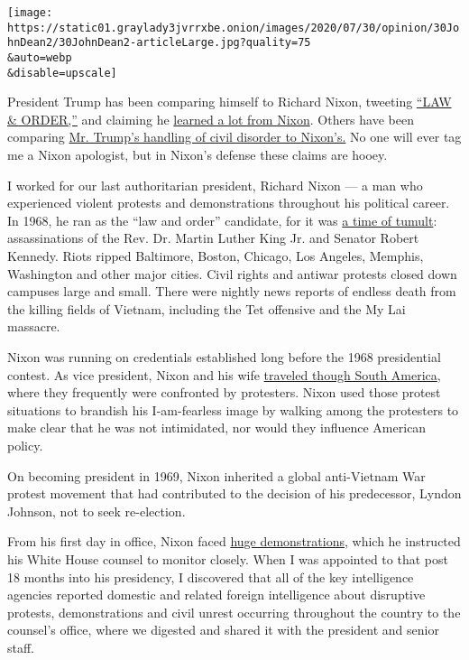 \texttt{[image: https://static01.graylady3jvrrxbe.onion/images/2020/07/30/opinion/30JohnDean2/30JohnDean2-articleLarge.jpg?quality=75\\\&auto=webp\\\&disable=upscale]}

President Trump has been comparing himself to Richard Nixon, tweeting
\href{https://twitter.com/realDonaldTrump/status/1267227396341669889}{``LAW
\& ORDER,''} and claiming he
\href{https://www.youtube.com/watch?v=mY12Llo847I}{learned a lot from
Nixon}. Others have been comparing
\href{https://www.nytimes3xbfgragh.onion/2020/06/02/opinion/floyd-trump-nixon-coronavirus.html}{Mr.
Trump's handling of civil disorder to Nixon's.} No one will ever tag me
a Nixon apologist, but in Nixon's defense these claims are hooey.

I worked for our last authoritarian president, Richard Nixon --- a man
who experienced violent protests and demonstrations throughout his
political career. In 1968, he ran as the ``law and order'' candidate,
for it was
\href{https://www.theguardian.com/us-news/2020/jun/16/trump-nixon-1968-law-and-order-america}{a
time of tumult}: assassinations of the Rev. Dr. Martin Luther King Jr.
and Senator Robert Kennedy. Riots ripped Baltimore, Boston, Chicago, Los
Angeles, Memphis, Washington and other major cities. Civil rights and
antiwar protests closed down campuses large and small. There were
nightly news reports of endless death from the killing fields of
Vietnam, including the Tet offensive and the My Lai massacre.

Nixon was running on credentials established long before the 1968
presidential contest. As vice president, Nixon and his wife
\href{https://history.state.gov/historicaldocuments/frus1958-60v05/comp4}{traveled
though South America}, where they frequently were confronted by
protesters. Nixon used those protest situations to brandish his
I-am-fearless image by walking among the protesters to make clear that
he was not intimidated, nor would they influence American policy.

On becoming president in 1969, Nixon inherited a global anti-Vietnam War
protest movement that had contributed to the decision of his
predecessor, Lyndon Johnson, not to seek re-election.

From his first day in office, Nixon faced
\href{https://learning.blogs.nytimes3xbfgragh.onion/2011/11/15/nov-15-1969-anti-vietnam-war-demonstration-held/}{huge
demonstrations,} which he instructed his White House counsel to monitor
closely. When I was appointed to that post 18 months into his
presidency, I discovered that all of the key intelligence agencies
reported domestic and related foreign intelligence about disruptive
protests, demonstrations and civil unrest occurring throughout the
country to the counsel's office, where we digested and shared it with
the president and senior staff.

